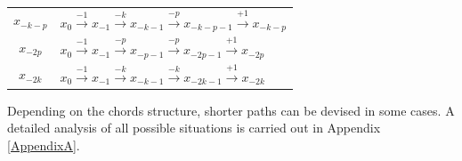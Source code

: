 \begin{center}
\begin{tabular}{|c|l|}
 $x_{-k-p}$  & $ x_{0} \xrightarrow {-1} x_{-1} \xrightarrow {-k} x_{-k-1} \xrightarrow {-p} x_{-k-p-1}\xrightarrow {+1} x_{-k-p} $\\

$x_{-2p}$  & $ x_{0} \xrightarrow {-1} x_{-1} \xrightarrow {-p} x_{-p-1} \xrightarrow {-p} x_{-2p-1}\xrightarrow {+1} x_{-2p} $\\
$x_{-2k}$  & $ x_{0} \xrightarrow {-1} x_{-1} \xrightarrow {-k} x_{-k-1} \xrightarrow {-k} x_{-2k-1}\xrightarrow {+1} x_{-2k} $\\

 \hline
 \end{tabular}
 \end{center}

Depending on the chords structure, shorter paths can be devised in some cases. A detailed analysis of all possible situations is carried out in Appendix \ref{AppendixA}.
 

